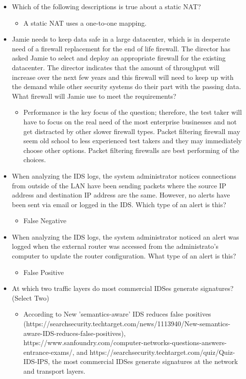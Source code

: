 \begin{itemize}
\begin{itemize}
    \end{itemize}
    \item Which of the following descriptions is true about a static NAT?
    \begin{itemize}
        \item A static NAT uses a one-to-one mapping.
    \end{itemize}
    \item Jamie needs to keep data safe in a large datacenter, which is in desperate need of a firewall replacement for the end of life firewall. The director has asked Jamie to select and deploy an appropriate firewall for the existing datacenter. The director indicates that the amount of throughput will increase over the next few years and this firewall will need to keep up with the demand while other security systems do their part with the passing data. What firewall will Jamie use to meet the requirements?
    \begin{itemize}
        \item Performance is the key focus of the question; therefore, the test taker will have to focus on the real need of the most enterprise businesses and not get distracted by other slower firewall types. Packet filtering firewall may seem old school to less experienced test takers and they may immediately choose other options.
        Packet filtering firewalls are best performing of the choices.
    \end{itemize}
    \item When analyzing the IDS logs, the system administrator notices connections from outside of the LAN have been sending packets where the source IP address and destination IP address are the same. However, no alerts have been sent via email or logged in the IDS. Which type of an alert is this?
    \begin{itemize}
        \item False Negative
    \end{itemize}
    \item When analyzing the IDS logs, the system administrator noticed an alert was logged when the external router was accessed from the administrato's computer to update the router configuration. What type of an alert is this?
    \begin{itemize}
        \item False Positive
    \end{itemize}
    \item At which two traffic layers do most commercial IDSes generate signatures? (Select Two)
    \begin{itemize}
        \item According to New 'semantics-aware' IDS reduces false positives (https://searchsecurity.techtarget.com/news/1113940/New-semantics-aware-IDS-reduces-false-positives), https://www.sanfoundry.com/computer-networks-questions-answers-entrance-exams/, and https://searchsecurity.techtarget.com/quiz/Quiz-IDS-IPS, the most commercial IDSes generate signatures at the network and transport layers.
    \end{itemize}
\end{itemize}
